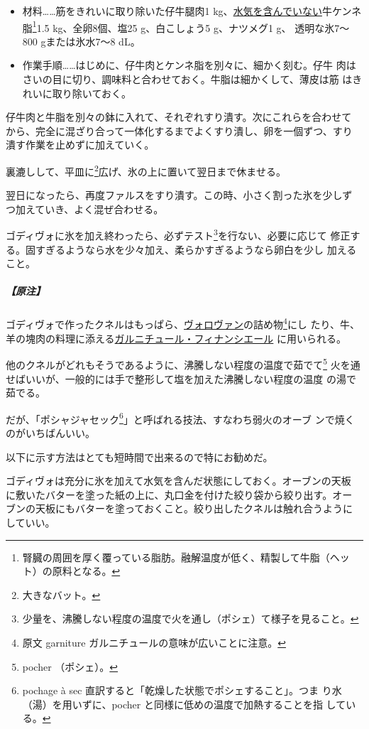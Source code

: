 \begin{recette}
\begin{itemize}
\item
  材料\ldots{}\ldots{}筋をきれいに取り除いた仔牛腿肉1
  kg、\ul{水気を含んでいない}牛ケンネ脂\footnote{腎臓の周囲を厚く覆っている脂肪。融解温度が低く、精製して牛脂（ヘッ
    ト）の原料となる。}1.5 kg、全卵8個、塩25 g、白こしょう5 g、ナツメグ1
  g、 透明な氷7〜800 gまたは氷水7〜8 dL。
\item
  作業手順\ldots{}\ldots{}はじめに、仔牛肉とケンネ脂を別々に、細かく刻む。仔牛
  肉はさいの目に切り、調味料と合わせておく。牛脂は細かくして、薄皮は筋
  はきれいに取り除いておく。
\end{itemize}

仔牛肉と牛脂を別々の鉢に入れて、それぞれすり潰す。次にこれらを合わせて
から、完全に混ざり合って一体化するまでよくすり潰し、卵を一個ずつ、すり
潰す作業を止めずに加えていく。

裏漉しして、平皿に\footnote{大きなバット。}広げ、氷の上に置いて翌日まで休ませる。

翌日になったら、再度ファルスをすり潰す。この時、小さく割った氷を少しず
つ加えていき、よく混ぜ合わせる。

ゴディヴォに氷を加え終わったら、必ずテスト\footnote{少量を、沸騰しない程度の温度で火を通し（ポシェ）て様子を見ること。}を行ない、必要に応じて
修正する。固すぎるようなら水を少々加え、柔らかすぎるようなら卵白を少し
加えること。

\hypertarget{nota-godiveau-a}{%
\subparagraph{【原注】}\label{nota-godiveau-a}}

ゴディヴォで作ったクネルはもっぱら、\protect\hyperlink{vol-au-vent}{ヴォロヴァン}の詰め物\footnote{原文
  garniture ガルニチュールの意味が広いことに注意。}にし
たり、牛、羊の塊肉の料理に添える\protect\hyperlink{garniture-financiere}{ガルニチュール・フィナンシエール}
に用いられる。

他のクネルがどれもそうであるように、沸騰しない程度の温度で茹でて\footnote{pocher
  （ポシェ）。}
火を通せばいいが、一般的には手で整形して塩を加えた沸騰しない程度の温度
の湯で茹でる。

だが、「ポシャジャセック\footnote{pochage à sec
  直訳すると「乾燥した状態でポシェすること」。つま
  り水（湯）を用いずに、pocher と同様に低めの温度で加熱することを指
  している。}」と呼ばれる技法、すなわち弱火のオーブ
ンで焼くのがいちばんいい。

以下に示す方法はとても短時間で出来るので特にお勧めだ。

ゴディヴォは充分に氷を加えて水気を含んだ状態にしておく。オーブンの天板
に敷いたバターを塗った紙の上に、丸口金を付けた絞り袋から絞り出す。オー
ブンの天板にもバターを塗っておくこと。絞り出したクネルは触れ合うように
していい。


\end{recette}
